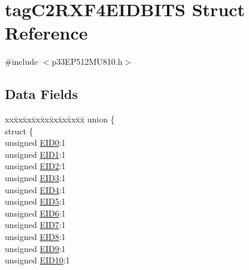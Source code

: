 \hypertarget{structtag_c2_r_x_f4_e_i_d_b_i_t_s}{}\section{tag\+C2\+R\+X\+F4\+E\+I\+D\+B\+I\+TS Struct Reference}
\label{structtag_c2_r_x_f4_e_i_d_b_i_t_s}


{\ttfamily \#include $<$p33\+E\+P512\+M\+U810.\+h$>$}

\subsection*{Data Fields}
\begin{DoxyCompactItemize}
\item 
\begin{tabbing}
xx\=xx\=xx\=xx\=xx\=xx\=xx\=xx\=xx\=\kill
union \{\\
\>struct \{\\
\>\>unsigned \hyperlink{structtag_c2_r_x_f4_e_i_d_b_i_t_s_a9da8b7b30247e4f9cd8cc056549aa9fd}{EID0}:1\\
\>\>unsigned \hyperlink{structtag_c2_r_x_f4_e_i_d_b_i_t_s_afd6c139491d147c1262f3d051c6691e9}{EID1}:1\\
\>\>unsigned \hyperlink{structtag_c2_r_x_f4_e_i_d_b_i_t_s_a36ec62d8d3c5acd5d15e6691dc099a94}{EID2}:1\\
\>\>unsigned \hyperlink{structtag_c2_r_x_f4_e_i_d_b_i_t_s_ab895f7d0ac289a0383b607cbc62eebe2}{EID3}:1\\
\>\>unsigned \hyperlink{structtag_c2_r_x_f4_e_i_d_b_i_t_s_a136d5a709d6618d40acceccb43036656}{EID4}:1\\
\>\>unsigned \hyperlink{structtag_c2_r_x_f4_e_i_d_b_i_t_s_a8dffb2d86a6c184df505ae7c71a58710}{EID5}:1\\
\>\>unsigned \hyperlink{structtag_c2_r_x_f4_e_i_d_b_i_t_s_af8a8574102515d8f1a4b7fd1685d0532}{EID6}:1\\
\>\>unsigned \hyperlink{structtag_c2_r_x_f4_e_i_d_b_i_t_s_a84c3262e67f8d5fd387ac10bde6fa9b1}{EID7}:1\\
\>\>unsigned \hyperlink{structtag_c2_r_x_f4_e_i_d_b_i_t_s_acca25e0b7d86eb499d01f85222baea87}{EID8}:1\\
\>\>unsigned \hyperlink{structtag_c2_r_x_f4_e_i_d_b_i_t_s_ac6748f73d4ada8538b06548be4f396c2}{EID9}:1\\
\>\>unsigned \hyperlink{structtag_c2_r_x_f4_e_i_d_b_i_t_s_a9cea8e77ecbb72bd3b08102412793725}{EID10}:1\\

\end{tabbing}
\end{DoxyCompactItemize}
